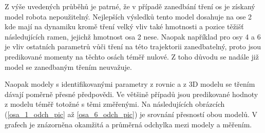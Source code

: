 Z výše uvedených průběhů je patrné, že v případě zanedbání tření os je získaný model robota nepoužitelný. Nejlepších výsledků tento model dosahuje na ose 2 kde mají na dynamiku kromě tření velký vliv také hmotnosti a pozice těžišť následujících ramen, jejichž hmotnost osa 2 nese. Naopak například pro osy 4 a 6 je vliv ostatních parametrů vůči tření na této trajektorii zanedbatelný, proto jsou predikované momenty na těchto osách téměř nulové. Z toho důvodu se nadále již model se zanedbaným třením neuvažuje.

Naopak modely s identifikovanými parametry z rovnic a z 3D modelu se třením dávají poměrně přesné předpovědi. Ve většině případů jsou predikované hodnoty z modelu téměř totožné s těmi změřenými. Na následujících obrázcích (\ref{osa_1_odch_pic} až \ref{osa_6_odch_pic}) je srovnání přesností obou modelů. V grafech je znázorněna okamžitá a průměrná odchylka mezi modely a měřením.

